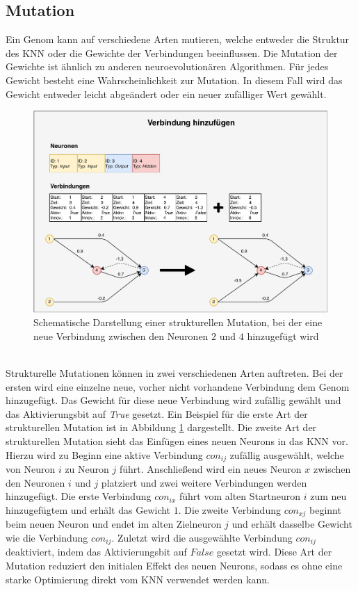 \subsection{Mutation}
\label{subsec:neat_mutation}
Ein Genom kann auf verschiedene Arten mutieren, welche entweder die Struktur des \ac{KNN} oder die Gewichte der Verbindungen beeinflussen. Die Mutation der Gewichte ist ähnlich zu anderen neuroevolutionären Algorithmen. Für jedes Gewicht besteht eine Wahrscheinlichkeit zur Mutation. In diesem Fall wird das Gewicht entweder leicht abgeändert oder ein neuer zufälliger Wert gewählt.
\begin{figure}[!h]
	\centering
	\includegraphics[width=1\textwidth]{./img/neat-AddConnectionMutation.pdf} 
	\caption{Schematische Darstellung einer strukturellen Mutation, bei der eine neue Verbindung zwischen den Neuronen $2$ und $4$ hinzugefügt wird}
	\label{fig:neat_add_connectin_mutation}
\end{figure}
\\ \noindent
Strukturelle Mutationen können in zwei verschiedenen Arten auftreten. Bei der ersten wird eine einzelne neue, vorher nicht vorhandene Verbindung dem Genom hinzugefügt. Das Gewicht für diese neue Verbindung wird zufällig gewählt und das Aktivierungsbit auf \emph{True} gesetzt. Ein Beispiel für die erste Art der strukturellen Mutation ist in Abbildung \ref{fig:neat_add_connectin_mutation} dargestellt. Die zweite Art der strukturellen Mutation sieht das Einfügen eines neuen Neurons in das \ac{KNN} vor. Hierzu wird zu Beginn eine aktive Verbindung $con_{ij} $ zufällig ausgewählt, welche von Neuron $i$ zu Neuron $j$ führt. Anschließend wird ein neues Neuron $x$ zwischen den Neuronen $i$ und $j$ platziert und zwei weitere Verbindungen werden hinzugefügt. Die erste Verbindung $con_{ix}$ führt vom alten Startneuron $i$ zum neu hinzugefügtem und erhält das Gewicht $1$. Die zweite Verbindung $con_{xj}$ beginnt beim neuen Neuron und endet im alten Zielneuron $j$ und erhält dasselbe Gewicht wie die Verbindung $con_{ij}$. Zuletzt wird die ausgewählte Verbindung $con_{ij}$ deaktiviert, indem das Aktivierungsbit auf $False$ gesetzt wird. Diese Art der Mutation reduziert den initialen Effekt des neuen Neurons, sodass es ohne eine starke Optimierung direkt vom \ac{KNN} verwendet werden kann.
